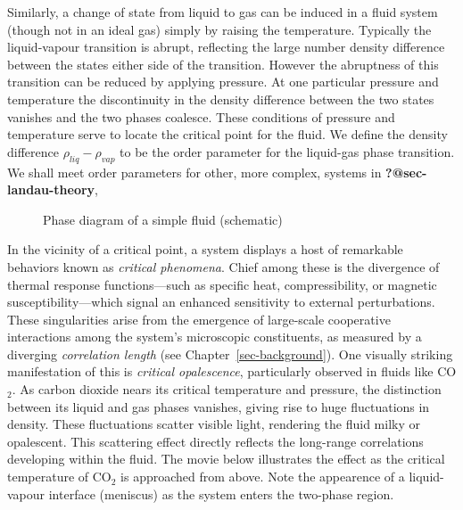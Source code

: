 \documentclass[
  letterpaper,
  enabledeprecatedfontcommands]{report}
\begin{document}
Similarly, a change of state from liquid to gas can be induced in a
fluid system (though not in an ideal gas) simply by raising the
temperature. Typically the liquid-vapour transition is abrupt,
reflecting the large number density difference between the states either
side of the transition. However the abruptness of this transition can be
reduced by applying pressure. At one particular pressure and temperature
the discontinuity in the density difference between the two states
vanishes and the two phases coalesce. These conditions of pressure and
temperature serve to locate the critical point for the fluid. We define
the density difference \(\rho_{liq}-\rho_{vap}\) to be the order
parameter for the liquid-gas phase transition. We shall meet order
parameters for other, more complex, systems in
\textbf{?@sec-landau-theory},

\begin{figure}


\caption{\label{fig-fluidpd}Phase diagram of a simple fluid (schematic)}

\end{figure}%

In the vicinity of a critical point, a system displays a host of
remarkable behaviors known as \emph{critical phenomena}. Chief among
these is the divergence of thermal response functions---such as specific
heat, compressibility, or magnetic susceptibility---which signal an
enhanced sensitivity to external perturbations. These singularities
arise from the emergence of large-scale cooperative interactions among
the system's microscopic constituents, as measured by a diverging
\emph{correlation length} (see Chapter~\ref{sec-background}). One
visually striking manifestation of this is \emph{critical opalescence},
particularly observed in fluids like CO\(_2\). As carbon dioxide nears
its critical temperature and pressure, the distinction between its
liquid and gas phases vanishes, giving rise to huge fluctuations in
density. These fluctuations scatter visible light, rendering the fluid
milky or opalescent. This scattering effect directly reflects the
long-range correlations developing within the fluid. The movie below
illustrates the effect as the critical temperature of CO\(_2\) is
approached from above. Note the appearence of a liquid-vapour interface
(meniscus) as the system enters the two-phase region.
\end{document}
